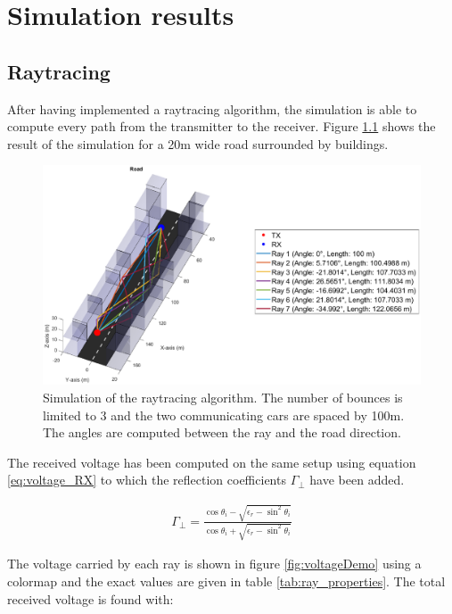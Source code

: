 \documentclass[10pt,a4paper]{ULBreport}
\begin{document}
\chapter{Simulation results}
\section{Raytracing}

After having implemented a raytracing algorithm, the simulation is able to compute every path from the transmitter to the receiver. Figure \ref{fig:raytracingDemo} shows the result of the simulation for a 20m wide road surrounded by buildings. 

\begin{figure}[H]
    \centering
    \includegraphics[width=1\textwidth]{3_1.eps}
    \caption{Simulation of the raytracing algorithm. The number of bounces is limited to 3 and the two communicating cars are spaced by 100m. The angles are computed between the ray and the road direction.}
    \label{fig:raytracingDemo}
\end{figure}

The received voltage has been computed on the same setup using equation \ref{eq:voltage_RX} to which the reflection coefficients $\Gamma_{\perp}$ have been added. 

\begin{align*}
    \Gamma_{\perp} = \frac{\cos \theta_i - \sqrt{\epsilon_r-\sin^2\theta_i}}{\cos \theta_i + \sqrt{\epsilon_r-\sin^2\theta_i}}
\end{align*}

The voltage carried by each ray is shown in figure \ref{fig:voltageDemo} using a colormap and the exact values are given in table \ref{tab:ray_properties}. The total received voltage is found with:
\vspace{-1cm}
\end{document}
